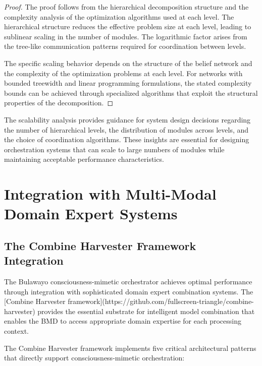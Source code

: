 \documentclass[12pt,a4paper]{article}
\begin{document}
\begin{proof}
The proof follows from the hierarchical decomposition structure and the complexity analysis of the optimization algorithms used at each level. The hierarchical structure reduces the effective problem size at each level, leading to sublinear scaling in the number of modules. The logarithmic factor arises from the tree-like communication patterns required for coordination between levels.

The specific scaling behavior depends on the structure of the belief network and the complexity of the optimization problems at each level. For networks with bounded treewidth and linear programming formulations, the stated complexity bounds can be achieved through specialized algorithms that exploit the structural properties of the decomposition.
\end{proof}

The scalability analysis provides guidance for system design decisions regarding the number of hierarchical levels, the distribution of modules across levels, and the choice of coordination algorithms. These insights are essential for designing orchestration systems that can scale to large numbers of modules while maintaining acceptable performance characteristics.

\section{Integration with Multi-Modal Domain Expert Systems}

\subsection{The Combine Harvester Framework Integration}

The Bulawayo consciousness-mimetic orchestrator achieves optimal performance through integration with sophisticated domain expert combination systems. The [Combine Harvester framework](https://github.com/fullscreen-triangle/combine-harvester) provides the essential substrate for intelligent model combination that enables the BMD to access appropriate domain expertise for each processing context.

The Combine Harvester framework implements five critical architectural patterns that directly support consciousness-mimetic orchestration:
\end{document}

